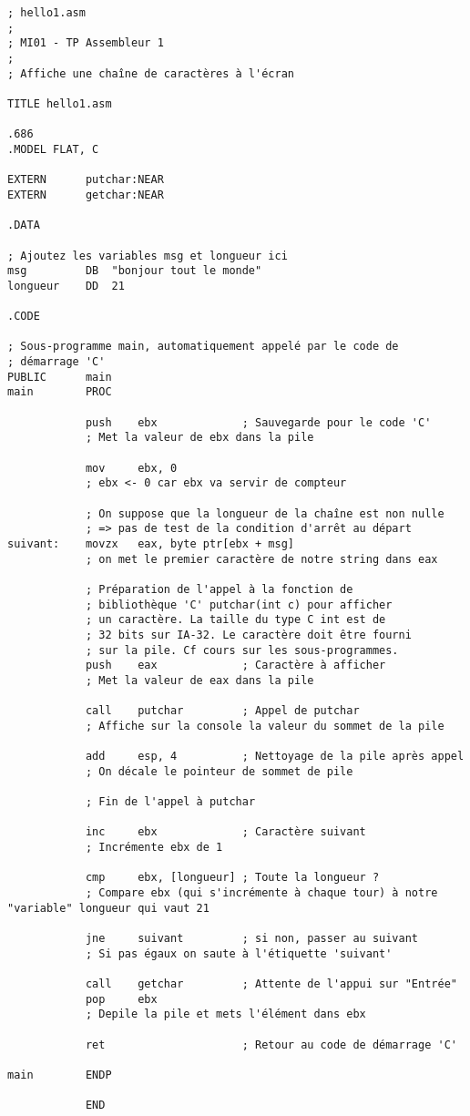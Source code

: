 \begin{lstlisting}
; hello1.asm
;
; MI01 - TP Assembleur 1
;
; Affiche une chaîne de caractères à l'écran

TITLE hello1.asm

.686
.MODEL FLAT, C

EXTERN      putchar:NEAR
EXTERN      getchar:NEAR

.DATA

; Ajoutez les variables msg et longueur ici
msg			DB	"bonjour tout le monde"
longueur	DD	21

.CODE

; Sous-programme main, automatiquement appelé par le code de
; démarrage 'C'
PUBLIC      main
main        PROC

            push    ebx             ; Sauvegarde pour le code 'C'
			; Met la valeur de ebx dans la pile
			
            mov     ebx, 0
            ; ebx <- 0 car ebx va servir de compteur

            ; On suppose que la longueur de la chaîne est non nulle
            ; => pas de test de la condition d'arrêt au départ
suivant:    movzx   eax, byte ptr[ebx + msg]
			; on met le premier caractère de notre string dans eax

            ; Préparation de l'appel à la fonction de
            ; bibliothèque 'C' putchar(int c) pour afficher
            ; un caractère. La taille du type C int est de
            ; 32 bits sur IA-32. Le caractère doit être fourni
            ; sur la pile. Cf cours sur les sous-programmes.
            push    eax             ; Caractère à afficher
            ; Met la valeur de eax dans la pile
            
            call    putchar         ; Appel de putchar
            ; Affiche sur la console la valeur du sommet de la pile
            
            add     esp, 4          ; Nettoyage de la pile après appel
            ; On décale le pointeur de sommet de pile
            
            ; Fin de l'appel à putchar

            inc     ebx             ; Caractère suivant
            ; Incrémente ebx de 1
            
            cmp     ebx, [longueur] ; Toute la longueur ?
            ; Compare ebx (qui s'incrémente à chaque tour) à notre "variable" longueur qui vaut 21
            
            jne     suivant         ; si non, passer au suivant
            ; Si pas égaux on saute à l'étiquette 'suivant'

            call    getchar         ; Attente de l'appui sur "Entrée"
            pop     ebx
            ; Depile la pile et mets l'élément dans ebx

            ret                     ; Retour au code de démarrage 'C'

main        ENDP

            END
\end{lstlisting}

